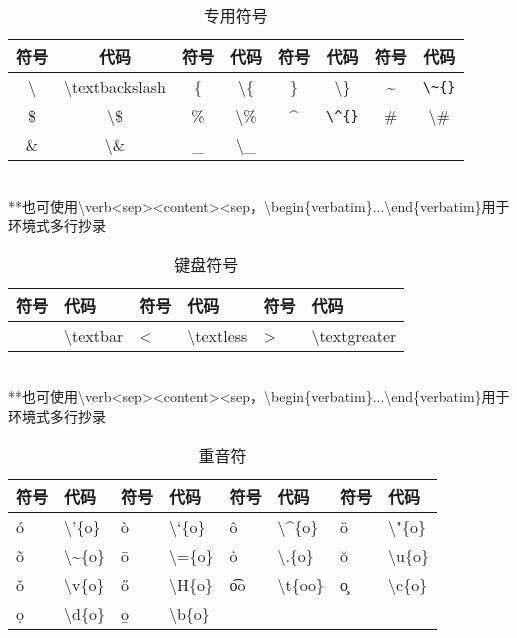 \documentclass[UTF8,fontset=ubuntu]{ctexbook}
\begin{document}
\begin{table}[H]
\begin{tabular}{c c c c c c c c}
	\hline
	符号 & 代码 & 符号 & 代码 & 符号 & 代码 & 符号 & 代码\\
	\hline
	\textbackslash & \textbackslash textbackslash & \{ & \textbackslash\{ & \} & \textbackslash\} & \~{} & \verb|\~{}|\\
	\$ & \textbackslash\$ & \% & \textbackslash\% & \^{} & \verb|\^{}| & \# & \textbackslash\#\\
	\& & \textbackslash\& & \_ & \textbackslash\_\\
	\hline
\end{tabular}\\[2mm]
\RaggedRight
**也可使用\textbackslash verb\textless sep\textgreater\textless content\textgreater\textless sep，\textbackslash begin\{verbatim\}...\textbackslash end\{verbatim\}用于环境式多行抄录\\
\caption{专用符号}
\end{table}

\begin{table}[H]
\begin{tabular}{l l l l l l}
	\hline
	符号 & 代码 & 符号 & 代码 & 符号 & 代码\\
	\hline
	\textbar & \textbackslash textbar & \textless & \textbackslash textless & \textgreater & \textbackslash textgreater\\
	\hline
\end{tabular}\\[2mm]
\RaggedRight
**也可使用\textbackslash verb\textless sep\textgreater\textless content\textgreater\textless sep，\textbackslash begin\{verbatim\}...\textbackslash end\{verbatim\}用于环境式多行抄录\\
\caption{键盘符号}
\end{table}

\begin{table}[H]
\begin{tabular}{l l l l l l l l}
	\hline
	符号 & 代码 & 符号 & 代码 & 符号 & 代码 & 符号 & 代码\\
	\hline
	\'{o} & \textbackslash'\{o\} & \`{o} & \textbackslash`\{o\} & \^{o} & \textbackslash\^{}\{o\} & \"{o} & \textbackslash"\{o\}\\
	\~{o} & \textbackslash\~{}\{o\} & \={o} & \textbackslash=\{o\} & \.{o} & \textbackslash.\{o\} & \u{o} & \textbackslash u\{o\}\\
	\v{o} & \textbackslash v\{o\} & \H{o} & \textbackslash H\{o\} & \t{oo} & \textbackslash t\{oo\} & \c{o} & \textbackslash c\{o\}\\
	\d{o} & \textbackslash d\{o\} & \b{o} & \textbackslash b\{o\}\\
	\hline
\end{tabular}
\caption{重音符}
\end{table}
\end{document}
